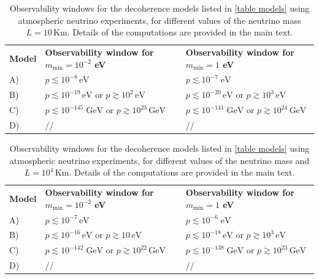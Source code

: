 \documentclass[11pt]{article}
\begin{document}
\begin{table}
    \centering
{\tabulinesep=1.2mm
        \begin{tabu}{|l|l|l|}
       {\small\bf{Model}} & {\footnotesize \bf{Observability window for $m_{\text{min}}=10^{-2}$ eV}} &{\footnotesize \bf{Observability window for $m_{\text{min}}=1$ eV}} \\ 
       {\small  A)} & $p\lesssim 10^{-8}\,\text{eV}$ & $p\lesssim 10^{-7}\; \text{eV}$\\ 
           {\small  B)} &  $p\lesssim 10^{-19}\,\text{eV}$ or $p\gtrsim 10^{2}\,\text{eV}$  & $p\lesssim 10^{-20}\,\text{eV}$ or $p\gtrsim 10^{3}\,\text{eV}$\\ 
        {\small  C)} & $p\lesssim 10^{-145}\;\text{GeV}$ or $p\gtrsim 10^{23}\,\text{GeV}$ & $p\lesssim 10^{-141}\;\text{GeV}$ or $p\gtrsim 10^{24}\,\text{GeV}$\\ 
        {\small  D)} &  // & // \\  
        \end{tabu}}
    \caption{Observability windows for the decoherence models listed in \cref{table models} using atmospheric neutrino experiments, for different values of the neutrino mass $L=10\,\text{Km}$. Details of the computations are provided in the main text.}
    \label{windows_atmo_table}
\end{table}


\begin{table}
    \centering
{\tabulinesep=1.2mm
        \begin{tabu}{|l|l|l|}
       {\small\bf{Model}} & {\footnotesize \bf{Observability window for $m_{\text{min}}=10^{-2}$ eV}} &{\footnotesize \bf{Observability window for $m_{\text{min}}=1$ eV}} \\ 
       {\small  A)} & $p\lesssim 10^{-7}\,\text{eV}$ & $p\lesssim 10^{-6}\; \text{eV}$\\ 
           {\small  B)} &  $p\lesssim 10^{-16}\,\text{eV}$ or $p\gtrsim 10\,\text{eV}$  & $p\lesssim 10^{-18}\,\text{eV}$ or $p\gtrsim 10^{3}\,\text{eV}$\\ 
        {\small  C)} & $p\lesssim 10^{-142}\;\text{GeV}$ or $p\gtrsim 10^{22}\,\text{GeV}$ & $p\lesssim 10^{-138}\;\text{GeV}$ or $p\gtrsim 10^{23}\,\text{GeV}$\\ 
        {\small  D)} &  // & // \\  
        \end{tabu}}
    \caption{Observability windows for the decoherence models listed in \cref{table models} using atmospheric neutrino experiments, for different values of the neutrino mass and $L=10^4\,\text{Km}$. Details of the computations are provided in the main text.}
    \label{windows_atmo_table_2}
\end{table}
\end{document}
